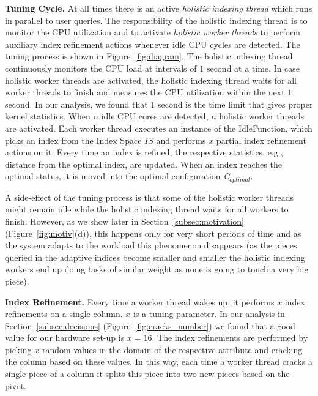 \textbf{Tuning Cycle.} 
At all times there is an active \emph{holistic indexing thread} which runs in parallel to user queries.
The responsibility of the holistic indexing thread is to monitor the CPU utilization and to activate \emph{holistic worker threads} 
to perform auxiliary index refinement actions whenever idle CPU cycles are detected.
The tuning process is shown in Figure~\ref{fig:diagram}.
The holistic indexing thread continuously monitors the CPU load at intervals of  $1$ second at a time.
In case holistic worker threads are activated, the holistic indexing thread waits for all worker threads to finish and measures the CPU utilization within the next $1$ second. 
In our analysis, we found that $1$ second is the time limit that gives proper kernel statistics.
When $n$ idle CPU cores are detected, $n$ holistic worker threads are activated.
Each worker thread executes an instance of the IdleFunction, which picks an index from the Index Space $IS$ and performs $x$ 
partial index refinement actions on it.
Every time an index is refined, the respective statistics, e.g., distance from the optimal index, are updated.
When an index reaches the optimal status, it is moved into the optimal configuration \emph{C$_{optimal}$}.

A side-effect of the tuning process is that some of the holistic worker threads might remain idle while the holistic indexing thread waits for all workers to finish.
However, as we show later in Section~\ref{subsec:motivation} (Figure~\ref{fig:motiv}(d)), this happens only for very short periods of time and as 
the system adapts to the workload this phenomenon disappears (as the pieces queried in the adaptive indices become smaller and smaller 
the holistic indexing workers end up doing tasks of similar weight as none is going to touch a very big piece).


\textbf{Index Refinement.}
Every time a worker thread wakes up, it performs $x$ index refinements on a single column. $x$ is a tuning parameter. 
In our analysis in Section~\ref{subsec:decisions} (Figure~\ref{fig:cracks_number}) we found that a good value for our hardware set-up is $x=16$. 
The index refinements are performed by picking $x$ random values in the domain of the respective
attribute and cracking the column based on these values. In this way, each time a worker thread cracks a single
piece of a column it splits this piece into two new pieces based on the pivot. 

